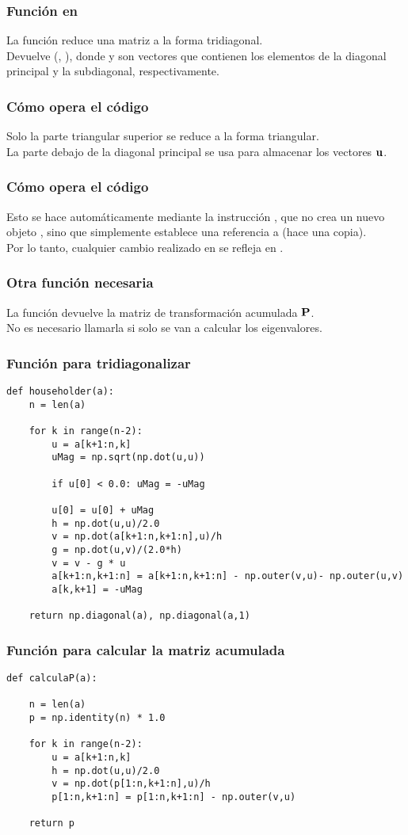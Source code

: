 \documentclass[12pt]{beamer}
\begin{document}
\begin{frame}
\frametitle{Función en \python}
La función  reduce una matriz a la forma tridiagonal.
\\
\bigskip
\pause
Devuelve (, ), donde  y  son vectores que contienen los elementos de la diagonal principal y la subdiagonal, respectivamente.
\end{frame}
\begin{frame}
\frametitle{Cómo opera el código}
Solo la parte triangular superior se reduce a la forma triangular.
\\
\bigskip
\pause
La parte debajo de la diagonal principal se usa para almacenar los vectores $\vb{u}$.
\end{frame}
\begin{frame}
\frametitle{Cómo opera el código}
Esto se hace automáticamente mediante la instrucción , que no crea un nuevo objeto , sino que simplemente establece una referencia a  (hace una copia).
\\
\bigskip
\pause
Por lo tanto, cualquier cambio realizado en  se refleja en .
\end{frame}
\begin{frame}
\frametitle{Otra función necesaria}
La función  devuelve la matriz de transformación acumulada $\vb{P}$.
\\
\bigskip
\pause
No es necesario llamarla si solo se van a calcular los eigenvalores.
\end{frame}
\begin{frame}
\frametitle{Función para tridiagonalizar}
\begin{lstlisting}[caption=Función householder]
def householder(a):
    n = len(a)
    
    for k in range(n-2):
        u = a[k+1:n,k]
        uMag = np.sqrt(np.dot(u,u))
        
        if u[0] < 0.0: uMag = -uMag
        
        u[0] = u[0] + uMag
        h = np.dot(u,u)/2.0
        v = np.dot(a[k+1:n,k+1:n],u)/h
        g = np.dot(u,v)/(2.0*h)
        v = v - g * u
        a[k+1:n,k+1:n] = a[k+1:n,k+1:n] - np.outer(v,u)- np.outer(u,v)
        a[k,k+1] = -uMag
        
    return np.diagonal(a), np.diagonal(a,1)
\end{lstlisting}
\end{frame}
\begin{frame}
\frametitle{Función para calcular la matriz acumulada}
\begin{lstlisting}[caption=Función calculaP]
def calculaP(a):
        
    n = len(a)
    p = np.identity(n) * 1.0
    
    for k in range(n-2):
        u = a[k+1:n,k]
        h = np.dot(u,u)/2.0
        v = np.dot(p[1:n,k+1:n],u)/h
        p[1:n,k+1:n] = p[1:n,k+1:n] - np.outer(v,u)
    
    return p
\end{lstlisting}
\end{frame}
\end{document}
